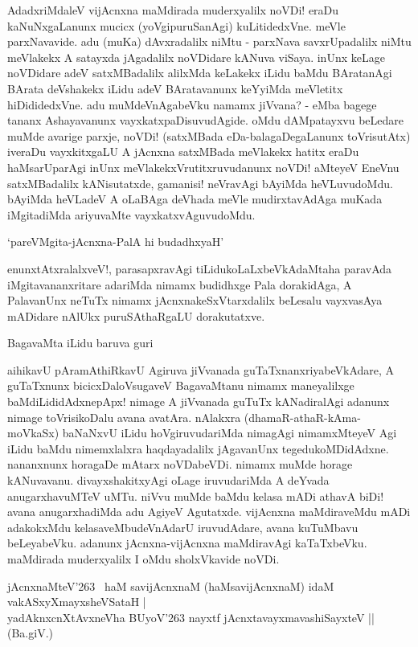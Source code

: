 AdadxriMdaleV vijAcnxna maMdirada muderxyalilx noVDi! eraDu kaNuNxgaLanunx mucicx (yoVgipuruSanAgi) kuLitidedxVne. meVle parxNavavide. adu (muKa) dAvxradalilx niMtu - parxNava savxrUpadalilx niMtu meVlakekx A satayxda jAgadalilx noVDidare kANuva viSaya. inUnx keLage noVDidare adeV satxMBadalilx alilxMda keLakekx iLidu baMdu BAratanAgi BArata deVshakekx iLidu adeV BAratavanunx keYyiMda meVletitx hiDididedxVne. adu muMdeVnAgabeVku namamx jiVvana? - eMba bagege tananx Ashayavanunx vayxkatxpaDisuvudAgide. oMdu dAMpatayxvu beLedare muMde avarige parxje, noVDi! (satxMBada eDa-balagaDegaLanunx toVrisutAtx) iveraDu vayxkitxgaLU A jAcnxna satxMBada meVlakekx hatitx eraDu haMsarUparAgi inUnx meVlakekxVrutitxruvudanunx noVDi! aMteyeV EneVnu satxMBadalilx kANisutatxde, gamanisi! neVravAgi bAyiMda heVLuvudoMdu. bAyiMda heVLadeV A oLaBAga deVhada meVle mudirxtavAdAga muKada iMgitadiMda ariyuvaMte vayxkatxvAguvudoMdu.

\begin{shloka}
`pareVMgita-jAcnxna-PalA hi budadhxyaH'
\end{shloka}

enunxtAtxralalxveV!, parasapxravAgi tiLidukoLaLxbeVkAdaMtaha paravAda iMgitavananxritare adariMda nimamx budidhxge Pala dorakidAga, A PalavanUnx neTuTx nimamx jAcnxnakeSxVtarxdalilx beLesalu vayxvasAya mADidare nAlUkx puruSAthaRgaLU dorakutatxve.

BagavaMta iLidu baruva guri

aihikavU pAramAthiRkavU Agiruva jiVvanada guTaTxnanxriyabeVkAdare, A guTaTxnunx bicicxDaloVsugaveV BagavaMtanu nimamx maneyalilxge baMdiLididAdxnepApx! nimage A jiVvanada guTuTx kANadiralAgi adanunx nimage toVrisikoDalu avana avatAra. nAlakxra (dhamaR-athaR-kAma-moVkaSx) baNaNxvU iLidu hoVgiruvudariMda nimagAgi nimamxMteyeV Agi iLidu baMdu nimemxlalxra haqdayadalilx jAgavanUnx tegedukoMDidAdxne. nananxnunx horagaDe mAtarx noVDabeVDi. nimamx muMde horage kANuvavanu. divayxshakitxyAgi oLage iruvudariMda A deYvada anugarxhavuMTeV uMTu. niVvu muMde baMdu kelasa mADi athavA biDi! avana anugarxhadiMda adu AgiyeV Agutatxde. vijAcnxna maMdiraveMdu mADi adakokxMdu kelasaveMbudeVnAdarU iruvudAdare, avana kuTuMbavu beLeyabeVku. adanunx jAcnxna-vijAcnxna maMdiravAgi kaTaTxbeVku. maMdirada muderxyalilx I oMdu sholxVkavide noVDi.

\begin{shloka}
jAcnxnaMteV\char'263 \, haM savijAcnxnaM (haMsavijAcnxnaM) idaM vakASxyXmayxsheVSataH |\\
yadAknxcnXtAvxneVha BUyoV\char'263 nayxtf jAcnxtavayxmavashiSayxteV || (Ba.giV.)
\end{shloka}

